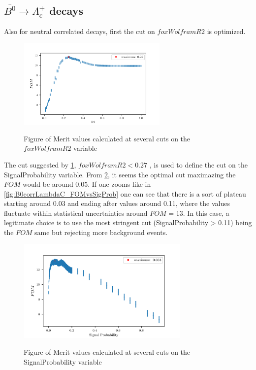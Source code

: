 \subsection{$\bar{B^0} \rightarrow \Lambda_c^+$ decays}
\label{sec:neutralCorrBtoLambdaC}

Also for neutral correlated decays, first  the cut on $foxWolframR2$ is optimized. 

\begin{figure}[h!]
    {\includegraphics[width=0.65\textwidth]{03-Selection/figs/corr_B0_FOMvsR2_cut.png}}
    \caption{Figure of Merit values calculated at several cuts on the $foxWolframR2$ variable}
    \label{fig:corr_B0_FOMvsR2_cut}
    \end{figure}

    The cut suggested by \cref{fig:corr_B0_FOMvsR2_cut},  $foxWolframR2 < 0.27$ , is used to define the cut on the
    SignalProbability variable. From \cref{fig:corr_B0_FOMvsSigProb_cut_until1}, it seems the optimal cut maximazing
the $FOM$ would be around 0.05. If one zooms like in \cref{fig:B0corrLambdaC_FOMvsSigProb} one can see that there is a 
sort of plateau starting around  0.03 and ending after values around 0.11, where the values fluctuate within statistical 
uncertainties around $FOM$ = 13. In this case, a legitimate choice is to use the most stringent cut (SignalProbability > 0.11) 
being the $FOM$ same but rejecting more background events.
    
    

\begin{figure}[H]
    {\includegraphics[width=0.75\textwidth]{03-Selection/figs/corr_B0_FOMvsSigProb_cut_until1.png}}
    \caption{Figure of Merit values calculated at several cuts on the SignalProbability variable}
    \label{fig:corr_B0_FOMvsSigProb_cut_until1}
    \end{figure}

